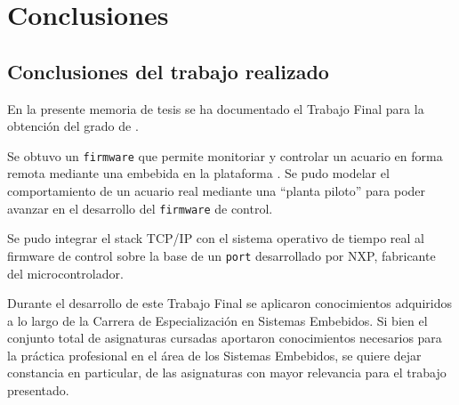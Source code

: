 
\chapter{Conclusiones} %

\label{Chapter5} %




\section{Conclusiones del trabajo realizado}

En la presente memoria de tesis se ha documentado el Trabajo Final para la obtención del grado de \degreename.  

Se obtuvo un \texttt{firmware} que permite monitoriar y controlar un acuario en forma remota mediante una  embebida en la plataforma . Se pudo modelar el comportamiento de un acuario real mediante una ``planta piloto'' para poder avanzar en el desarrollo del \texttt{firmware} de control.

Se pudo integrar el stack TCP/IP  con el sistema operativo de tiempo real  al firmware de control sobre la base de un \texttt{port} desarrollado por NXP, fabricante del microcontrolador.

\medskip

Durante el desarrollo de este Trabajo Final se aplicaron conocimientos adquiridos a lo largo de la Carrera de Especialización en Sistemas Embebidos.  Si bien el conjunto total de asignaturas cursadas  aportaron conocimientos necesarios para la práctica profesional en el área de los Sistemas Embebidos, se quiere dejar constancia en particular, de las asignaturas con mayor relevancia para el trabajo presentado.

